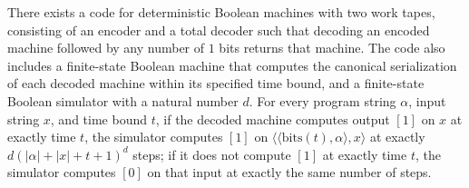 \begin{theorem}
\label{Turing.exists_uniformMachineCode2}
\leanok
{}
There exists a code for deterministic Boolean machines with two work tapes, consisting
of an encoder and a total decoder such that decoding an encoded machine followed by any
number of $1$ bits returns that machine. The code also includes a finite-state Boolean
machine that computes the canonical serialization of each decoded machine within its
specified time bound, and a finite-state Boolean simulator with a natural number $d$.
For every program string $\alpha$, input string $x$, and time bound $t$, if the decoded
machine computes output $[1]$ on $x$ at exactly time $t$, the simulator computes $[1]$
on $\langle\langle\mathrm{bits}(t),\alpha\rangle,x\rangle$ at exactly
$d(|\alpha|+|x|+t+1)^d$ steps; if it does not compute $[1]$ at exactly time $t$, the
simulator computes $[0]$ on that input at exactly the same number of steps.
\end{theorem}
